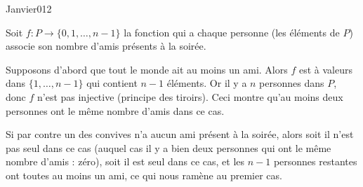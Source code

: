 \begin{corrige}{Janvier012}

Soit $f : P \to \{0, 1, \ldots, n-1\}$ la fonction qui a chaque personne (les éléments
de $P$) associe son nombre d'amis présents à la soirée.

Supposons d'abord que tout le monde ait au moins un ami. Alors $f$ est
à valeurs dans $\{1, \ldots, n-1\}$ qui contient $n-1$ éléments. Or il
y a $n$ personnes dans $P$, donc $f$ n'est pas injective (principe des
tiroirs). Ceci montre qu'au moins deux personnes ont le même nombre
d'amis dans ce cas.

Si par contre un des convives n'a aucun ami présent à la soirée, alors
soit il n'est pas seul dans ce cas (auquel cas il y a bien deux
personnes qui ont le même nombre d'amis : zéro), soit il est seul dans
ce cas, et les $n-1$ personnes restantes ont toutes au moins un ami,
ce qui nous ramène au premier cas.


\end{corrige}

